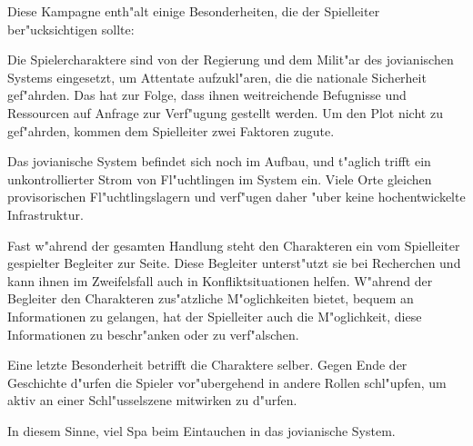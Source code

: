 Diese Kampagne enth"alt einige Besonderheiten, die der Spielleiter ber"ucksichtigen sollte:

Die Spielercharaktere sind von der Regierung und dem Milit"ar des jovianischen Systems eingesetzt, um Attentate aufzukl"aren, die die nationale Sicherheit gef"ahrden. Das hat zur Folge, dass ihnen weitreichende Befugnisse und Ressourcen auf Anfrage zur Verf"ugung gestellt werden. Um den Plot nicht zu gef"ahrden, kommen dem Spielleiter zwei Faktoren zugute. 

Das jovianische System befindet sich noch im Aufbau, und t"aglich trifft ein unkontrollierter Strom von Fl"uchtlingen im System ein. Viele Orte gleichen provisorischen Fl"uchtlingslagern und verf"ugen daher "uber keine hochentwickelte Infrastruktur.

Fast w"ahrend der gesamten Handlung steht den Charakteren ein vom Spielleiter gespielter Begleiter zur Seite. Diese Begleiter unterst"utzt sie bei Recherchen und kann ihnen im Zweifelsfall auch in Konfliktsituationen helfen. W"ahrend der Begleiter den Charakteren zus"atzliche M"oglichkeiten bietet, bequem an Informationen zu gelangen, hat der Spielleiter auch die M"oglichkeit, diese Informationen zu beschr"anken oder zu verf"alschen.

Eine letzte Besonderheit betrifft die Charaktere selber. Gegen Ende der Geschichte d"urfen die Spieler vor"ubergehend in andere Rollen schl"upfen, um aktiv an einer Schl"usselszene mitwirken zu d"urfen.

\vspace{1.5cm}
\begin{center}{\large{}In diesem Sinne, viel Spa\3 beim Eintauchen in das jovianische System.}\end{center}
